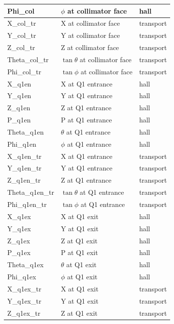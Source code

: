 \documentclass[11pt]{amsart}
\begin{document}
\begin{longtable}{| l | l | l |}
\hline
Phi\_col            & $\phi$ at collimator face  & hall \\
\hline
X\_col\_tr           & X at collimator face  & transport\\
\hline
Y\_col\_tr           & Y at collimator face  & transport\\
\hline
Z\_col\_tr           & Z at collimator face  & transport\\
\hline
Theta\_col\_tr       & $\tan{\theta}$ at collimator face  & transport\\
\hline
Phi\_col\_tr         & $\tan{\phi}$ at collimator face  & transport\\
\hline
\hline
X\_q1en              & X at Q1 entrance  & hall \\
\hline
Y\_q1en              & Y at Q1 entrance  & hall \\
\hline
Z\_q1en              & Z at Q1 entrance  & hall \\
\hline
P\_q1en              & P at Q1 entrance  & hall \\
\hline
Theta\_q1en          & $\theta$ at Q1 entrance  & hall \\
\hline
Phi\_q1en            & $\phi$ at Q1 entrance  & hall \\
\hline
X\_q1en\_tr           & X at Q1 entrance  & transport\\
\hline
Y\_q1en\_tr           & Y at Q1 entrance  & transport\\
\hline
Z\_q1en\_tr           & Z at Q1 entrance  & transport\\
\hline
Theta\_q1en\_tr       & $\tan{\theta}$ at Q1 entrance  & transport\\
\hline
Phi\_q1en\_tr         & $\tan{\phi}$ at Q1 entrance  & transport\\
\hline
\hline
X\_q1ex              & X at Q1 exit  & hall \\
\hline
Y\_q1ex              & Y at Q1 exit  & hall \\
\hline
Z\_q1ex              & Z at Q1 exit  & hall \\
\hline
P\_q1ex              & P at Q1 exit  & hall \\
\hline
Theta\_q1ex          & $\theta$ at Q1 exit  & hall \\
\hline
Phi\_q1ex            & $\phi$ at Q1 exit  & hall \\
\hline
X\_q1ex\_tr           & X at Q1 exit  & transport\\
\hline
Y\_q1ex\_tr           & Y at Q1 exit  & transport\\
\hline
Z\_q1ex\_tr           & Z at Q1 exit  & transport\\

\end{longtable}
\end{document}
